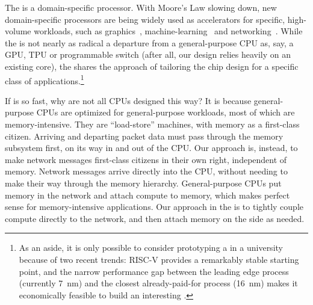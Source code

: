 The \name{} is a domain-specific processor. 
With Moore's Law slowing down, new domain-specific processors are being widely used as accelerators for specific, high-volume workloads, such as graphics~\cite{nvidia-geforce}, machine-learning~\cite{tensorflow} and networking~\cite{RMT}. 
While the \name{} is not nearly as radical a departure from a general-purpose CPU as, say, a GPU, TPU or programmable switch (after all, our design relies heavily on an existing core), the \name{} shares the approach of tailoring the chip design for a specific class of applications.\footnote{As an aside, it is only possible to consider prototyping a \name{} in a university because of two recent trends: RISC-V provides a remarkably stable starting point, and the narrow performance gap between the leading edge process (currently \SI{7}{nm}) and the closest already-paid-for process (\SI{16}{nm}) makes it economically feasible to build an interesting \name{}.}

If \name{} is so fast, why are not all CPUs designed this way? 
It is because general-purpose CPUs are optimized for general-purpose workloads, most of which are memory-intensive. 
They are ``load-store'' machines, with memory as a first-class citizen. 
Arriving and departing packet data must pass through the memory subsystem first, on its way in and out of the CPU. 
Our approach is, instead, to make network messages first-class citizens in their own right, independent of memory. 
Network messages arrive directly into the CPU, without needing to make their way through the memory hierarchy. 
General-purpose CPUs put memory in the network and attach compute to memory, which makes perfect sense for memory-intensive applications. 
Our approach in the \name{} is to tightly couple compute directly to the network, and then attach memory on the side as needed.

